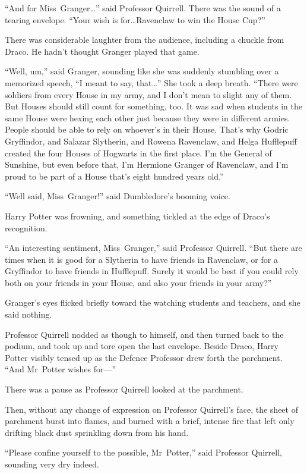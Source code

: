 “And for Miss~Granger…” said Professor Quirrell. There was the sound of
a tearing envelope. “Your wish is for…Ravenclaw to win the House Cup?”

There was considerable laughter from the audience, including a chuckle from
Draco. He hadn’t thought Granger played that game.

“Well, um,” said Granger, sounding like she was suddenly stumbling over a
memorized speech, “I meant to say, that…” She took a deep breath. “There
were soldiers from every House in my army, and I don’t mean to slight any of
them. But Houses should still count for something, too. It was sad when
students in the same House were hexing each other just because they were in
different armies. People should be able to rely on whoever’s in their House.
That’s why Godric Gryffindor, and Salazar Slytherin, and Rowena Ravenclaw, and
Helga Hufflepuff created the four Houses of Hogwarts in the first place. I’m
the General of Sunshine, but even before that, I’m Hermione Granger of
Ravenclaw, and I’m proud to be part of a House that’s eight hundred years old.”

“Well said, Miss~Granger!” said Dumbledore’s booming voice.

Harry Potter was frowning, and something tickled at the edge of Draco’s
recognition.

“An interesting sentiment, Miss~Granger,” said Professor Quirrell. “But there
are times when it is good for a Slytherin to have friends in Ravenclaw, or for
a Gryffindor to have friends in Hufflepuff. Surely it would be best if you
could rely both on your friends in your House, and also your friends in your
army?”

Granger’s eyes flicked briefly toward the watching students and teachers, and
she said nothing.

Professor Quirrell nodded as though to himself, and then turned back to the
podium, and took up and tore open the last envelope. Beside Draco, Harry Potter
visibly tensed up as the Defence Professor drew forth the parchment. “And
Mr~Potter wishes for—”

There was a pause as Professor Quirrell looked at the parchment.

Then, without any change of expression on Professor Quirrell’s face, the sheet
of parchment burst into flames, and burned with a brief, intense fire that left
only drifting black dust sprinkling down from his hand.

“Please confine yourself to the possible, Mr~Potter,” said Professor Quirrell,
sounding very dry indeed.


